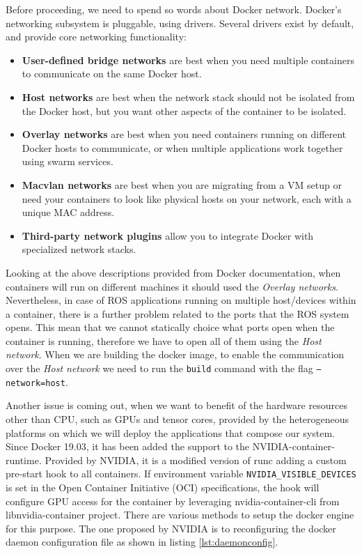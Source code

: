 Before proceeding, we need to spend so words about Docker network. Docker’s networking subsystem is pluggable, using drivers. Several drivers exist by default, and provide core networking functionality:
\begin{itemize}
	\item \textbf{User-defined bridge networks} are best when you need multiple containers to communicate on the same Docker host.
	\item \textbf{Host networks} are best when the network stack should not be isolated from the Docker host, but you want other aspects of the container to be isolated.
	\item \textbf{Overlay networks} are best when you need containers running on different Docker hosts to communicate, or when multiple applications work together using swarm services.
	\item \textbf{Macvlan networks} are best when you are migrating from a VM setup or need your containers to look like physical hosts on your network, each with a unique MAC address.
	\item \textbf{Third-party network plugins} allow you to integrate Docker with specialized network stacks.
\end{itemize}
Looking at the above descriptions provided from Docker documentation, when containers will run on different machines it should used the \textit{Overlay networks}. Nevertheless, in case of ROS applications running on multiple host/devices within a container, there is a further problem related to the ports that the ROS system opens. This mean that we cannot statically choice what ports open when the container is running, therefore we have to open all of them using the \textit{Host network}.
When we are building the docker image, to enable the communication over the \textit{Host network} we need to run the \texttt{build} command with the flag \texttt{--network=host}.

Another issue is coming out, when we want to benefit of the hardware resources other than CPU, such as GPUs and tensor cores, provided by the heterogeneous platforms on which we will deploy the applications that compose our system.
Since Docker 19.03, it has been added the support to the NVIDIA-container-runtime. Provided by NVIDIA, it is a modified version of runc adding a custom pre-start hook to all containers.
If environment variable \texttt{NVIDIA_VISIBLE_DEVICES} is set in the Open Container Initiative (OCI) specifications, the hook will configure GPU access for the container by leveraging nvidia-container-cli from libnvidia-container project.
There are various methods to setup the docker engine for this purpose.
The one proposed by NVIDIA is to reconfiguring the docker daemon configuration file as shown in listing \ref{lst:daemonconfig}.

